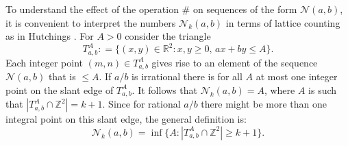 \documentclass[11pt]{amsart}
\newcommand{\1}{{{\mathchoice {\rm 1\mskip-4mu l} {\rm 1\mskip-4mu l}
{\rm 1\mskip-4.5mu l} {\rm 1\mskip-5mu l}}}}
\newcommand{\R}{{\mathbb R}}
\newcommand{\Z}{{\mathbb Z}}
\newcommand{\Nn}{{\mathcal N}}
\numberwithin{figure}{section}
\numberwithin{equation}{section}
\begin{document}
 To understand the effect of the operation $\#$  on sequences of the form $\Nn(a,b)$,
 it is convenient to interpret the numbers $\Nn_k(a,b)$ in terms of lattice counting as in  Hutchings \cite[\S3.3]{H}.  
For $A>0$ consider the triangle 
$$
T_{a,b}^A: =\bigl \{(x,y)\in\R^2 : x,y\ge 0 ,\, ax+by\le A\bigr\}.
$$  
Each integer point $(m,n)\in T_{a,b}^A$ gives rise to an element of the sequence $\Nn(a,b)$ that is $\le A$. If
$a/b$ is irrational  there is  for all $A$  at most
  one integer point on the slant edge of $T_{a,b}^A$. It follows that
 $
 \Nn_k(a,b) = A$, where $A$ is such that
  $|T_{a,b}^A\cap\Z^2|= k+1$.
 Since for rational $a/b$ there might be more than one integral point on this slant edge, 
the general definition is:
 $$
 \Nn_k(a,b) = \inf\bigl\{A: |T_{a,b}^A\cap\Z^2|\ge k+1\bigr\}.
 $$
\end{document}
